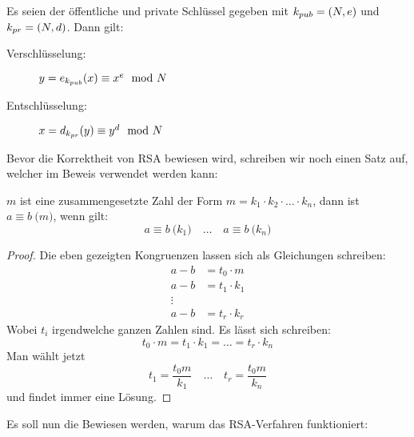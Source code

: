 \begin{definition}
  Es seien der öffentliche und private Schlüssel gegeben mit
  $k_{pub} = (N,e)$ und $k_{pr} = (N,d)$. Dann gilt:
  \begin{description}
    \item[Verschlüsselung:] $y = e_{k_{pub}}(x) \equiv x^e \mod{N}$
    \item[Entschlüsselung:] $x = d_{k_{pr}}(y) \equiv y^d \mod{N}$
  \end{description}
\end{definition}

\noindent
Bevor die Korrektheit von RSA bewiesen wird, schreiben wir noch einen Satz auf, welcher im
Beweis verwendet werden kann:

\begin{satz}
  \label{satz:composite-mod}
  $m$ ist eine zusammengesetzte Zahl der Form $m = k_1 \cdot k_2 \cdot \ldots \cdot k_n$, dann
  ist $a \equiv b \pod{m}$, wenn gilt:
  \begin{equation*}
    a \equiv b \pod{k_1} \quad\ldots\quad a \equiv b \pod{k_n}
  \end{equation*}
\end{satz}
\begin{proof}
  Die eben gezeigten Kongruenzen lassen sich als Gleichungen schreiben:
  \begin{align*}
    a - b & = t_0 \cdot m   \\
    a - b & = t_1 \cdot k_1 \\
    \vdots                  \\
    a - b & = t_r \cdot k_r
  \end{align*}
  Wobei $t_i$ irgendwelche ganzen Zahlen sind. Es lässt sich schreiben:
  \begin{equation*}
    t_0 \cdot m = t_1 \cdot k_1 = \ldots = t_r \cdot k_n
  \end{equation*}
  Man wählt jetzt
  \begin{equation*}
    t_1 = \frac{t_0m}{k_1} \quad\ldots\quad t_r = \frac{t_0m}{k_n}
  \end{equation*}
  und findet immer eine Lösung.
\end{proof}

\noindent
Es soll nun die Bewiesen werden, warum das RSA-Verfahren funktioniert:

